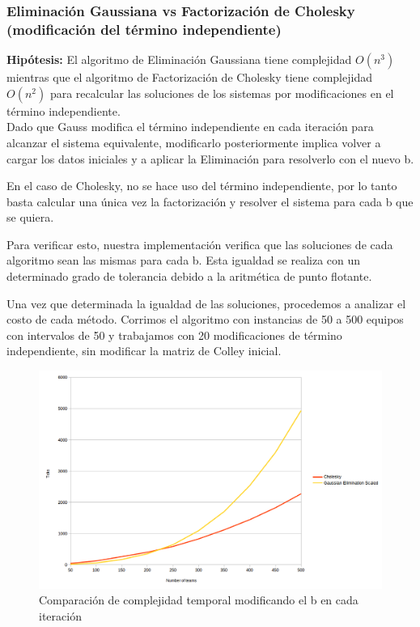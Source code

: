 \subsubsection{Eliminaci\'on Gaussiana vs Factorizaci\'on de Cholesky (modificaci\'on del t\'ermino independiente)}
\textbf{Hip\'otesis:} El algoritmo de Eliminaci\'on Gaussiana tiene complejidad $O(n^{3})$ mientras que el algoritmo de Factorizaci\'on de Cholesky tiene complejidad $O(n^{2})$ para recalcular las soluciones de los sistemas por modificaciones en el t\'ermino independiente. \\

Dado que Gauss modifica el t\'ermino independiente en cada iteraci\'on para alcanzar el sistema equivalente, modificarlo posteriormente implica volver a cargar los datos iniciales y a aplicar la Eliminaci\'on para resolverlo con el nuevo b.

En el caso de Cholesky, no se hace uso del t\'ermino independiente, por lo tanto basta calcular una \'unica vez la factorizaci\'on y resolver el sistema para cada b que se quiera.

Para verificar esto, nuestra implementaci\'on verifica que las soluciones de cada algoritmo sean las mismas para cada b. Esta igualdad se realiza con un determinado grado de tolerancia debido a la aritm\'etica de punto flotante.

Una vez que determinada la igualdad de las soluciones, procedemos a analizar el costo de cada m\'etodo. Corrimos el algoritmo con instancias de 50 a 500 equipos con intervalos de 50 y trabajamos con 20 modificaciones de t\'ermino independiente, sin modificar la matriz de Colley inicial.

\begin{figure}[h!]
  \begin{center}
	\includegraphics[scale=0.50]{imagenes/cuantitative/bChange/ColleyMatrixCuantitativeBChangeAnalysis.png}
	\caption{Comparaci\'on de complejidad temporal modificando el b en cada iteraci\'on}
	\label{bChange}
  \end{center}
\end{figure}

